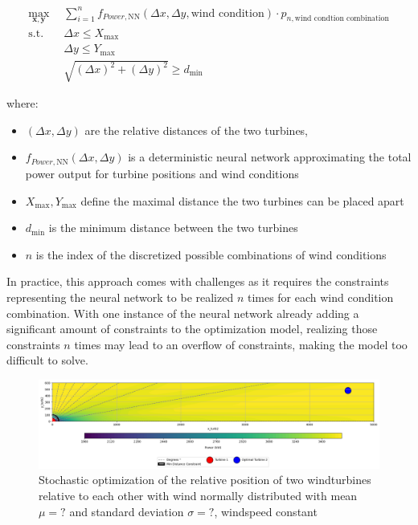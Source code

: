 \begin{align}
	\max_{\mathbf{x}, \mathbf{y}} &  \sum_{i=1}^{n} f_{Power,\text{NN}}(\Delta x, \Delta y, \text{wind condition})\cdot p_{n,\text{wind condtion combination}} \\
	\text{s.t.} \quad 
	&  \Delta x \leq X_{\max} \\
	&  \Delta y \leq Y_{\max} \\
	& \sqrt{(\Delta x)^2 + (\Delta y)^2} \geq d_{\min}
\end{align}

where:
\begin{itemize}
	\item \( (\Delta x, \Delta y) \) are the relative distances of the two turbines,
	\item \( f_{Power, \text{NN}}(\Delta x, \Delta y)\) is a deterministic neural network  approximating the total power output for turbine positions and wind conditions
	\item \(  X_{\max}, Y_{\max} \) define the maximal distance the two turbines can be placed apart
	\item \( d_{\min} \) is the minimum distance between the two turbines
	\item \( n \) is the index of the discretized possible combinations of wind conditions 
\end{itemize}

In practice, this approach comes with challenges as it requires the constraints representing the neural network to be realized $n$ times for each wind condition combination. With one instance of the neural network already adding a significant amount of constraints to the optimization model, realizing those constraints $n$ times may lead to an overflow of constraints, making the model too difficult to solve.
	

\begin{figure}[h] 
	\centering
	\includegraphics[width=1\textwidth]{figures/optimization/probabilistc_scenarios.png} 
	\caption{Stochastic optimization of the relative position of two windturbines relative to each other with wind normally distributed with mean $\mu = ?$ and standard deviation $\sigma = ?$, windspeed constant}
	\label{fig:two_turbine_heatmap_degeneracy}
\end{figure}
	
